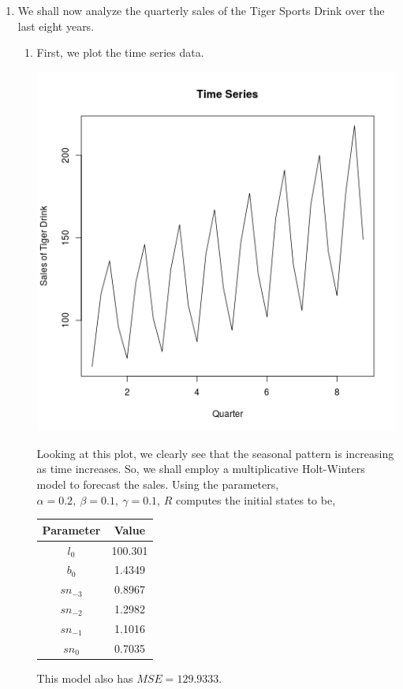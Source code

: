 \documentclass[letterpaper,10pt]{article}
\begin{document}
\begin{enumerate}
\begin{enumerate}
\end{enumerate}
\item We shall now analyze the quarterly sales of the Tiger Sports Drink over the last eight years.
\begin{enumerate}
\item First, we plot the time series data.
\begin{center}
\includegraphics[scale=0.8]{tigersales.png}
\end{center}
Looking at this plot, we clearly see that the seasonal pattern is increasing as time increases.  So, we shall employ a multiplicative Holt-Winters model to forecast the sales. Using the parameters, $\alpha=0.2,\ \beta=0.1,\ \gamma=0.1$, $R$ computes the initial states to be,
\begin{center}
\begin{tabular}{|c|c|}
\hline
Parameter & Value\\\hline
$l_0$ & 100.301\\
$b_0$ & 1.4349\\
$sn_{-3}$ & 0.8967\\
$sn_{-2}$ & 1.2982\\
$sn_{-1}$ & 1.1016\\
$sn_0$ & 0.7035\\\hline
\end{tabular}
\end{center}
This model also has $MSE=129.9333$.

\end{enumerate}
\end{enumerate}
\end{document}
